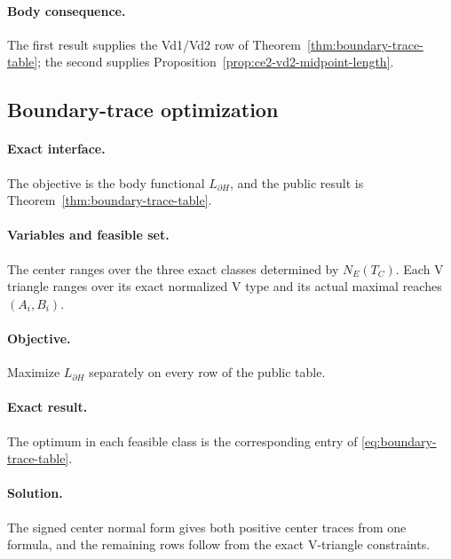 \paragraph{Body consequence.}
The first result supplies the Vd1/Vd2 row of
Theorem~\ref{thm:boundary-trace-table}; the second supplies
Proposition~\ref{prop:ce2-vd2-midpoint-length}.

\subsection{Boundary-trace optimization}
\label{subsec:app-boundary-trace-optimization}

\paragraph{Exact interface.}
The objective is the body functional $L_{\partial H}$, and the public result is
Theorem~\ref{thm:boundary-trace-table}.

\paragraph{Variables and feasible set.}
The center ranges over the three exact classes determined by $N_E(T_C)$.
Each V triangle ranges over its exact normalized V type and its actual maximal
reaches $(A_i,B_i)$.

\paragraph{Objective.}
Maximize $L_{\partial H}$ separately on every row of the public table.

\paragraph{Exact result.}
The optimum in each feasible class is the corresponding entry of
\eqref{eq:boundary-trace-table}.

\paragraph{Solution.}
The signed center normal form gives both positive center traces from one
formula, and the remaining rows follow from the exact V-triangle constraints.

